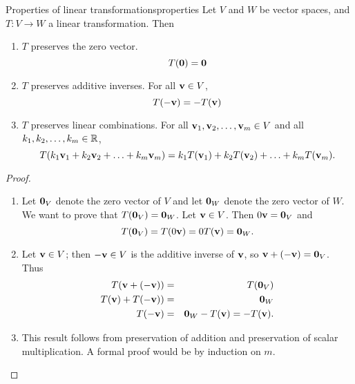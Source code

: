 \begin{theorem}{Properties of linear transformations}{properties}
  Let $V$ and $W$ be vector spaces, and $T:V \to W$ a linear
  transformation.  Then
  \begin{enumerate}
  \item $T$ preserves the zero vector.
    \begin{equation*}
      T(\mbox{\bf 0})=\mbox{\bf 0}
    \end{equation*}
  \item $T$ preserves additive inverses.
    For all $\mbox{\bf v}\in V$,
    \begin{equation*}
      T(-\mbox{\bf v})= -T(\mbox{\bf v})
    \end{equation*}
  \item $T$ preserves linear combinations.
    For all $\mbox{\bf v}_1, \mbox{\bf v}_2, \ldots, \mbox{\bf v}_m \in V$ and
    all $k_1, k_2, \ldots, k_m\in\mathbb{R}$,
    \begin{equation*}
      T(k_1\mbox{\bf v}_1 + k_2\mbox{\bf v}_2 + \ldots + k_m\mbox{\bf v}_m)
      = k_1T(\mbox{\bf v}_1) + k_2T(\mbox{\bf v}_2) + \ldots + k_mT(\mbox{\bf v}_m).
    \end{equation*}
  \end{enumerate}
\end{theorem}

\begin{proof}
  \begin{enumerate}
  \item Let $\mbox{\bf 0}_V$ denote the zero vector of $V$ and let
    $\mbox{\bf 0}_W$ denote the zero vector of $W$.  We want to prove that
    $T(\mbox{\bf 0}_V)=\mbox{\bf 0}_W$.  Let $\mbox{\bf v}\in V$.  Then
    $0\mbox{\bf v}=\mbox{\bf 0}_V$ and
    \begin{equation*}
      T(\mbox{\bf 0}_V)=T(0\mbox{\bf v})=0T(\mbox{\bf v})=\mbox{\bf 0}_W.
    \end{equation*}
  \item Let $\mbox{\bf v}\in V$; then $-\mbox{\bf v}\in V$ is the additive
    inverse of $\mbox{\bf v}$, so $\mbox{\bf v} + (-\mbox{\bf v})=\mbox{\bf 0}_V$.
    Thus
    \begin{eqnarray*}
      T(\mbox{\bf v} + (-\mbox{\bf v})) & = & T(\mbox{\bf 0}_V) \\
      T(\mbox{\bf v}) + T(-\mbox{\bf v})) & = & \mbox{\bf 0}_W \\
      T(-\mbox{\bf v}) & = & \mbox{\bf 0}_W - T(\mbox{\bf v}) =  - T(\mbox{\bf v}).
    \end{eqnarray*}
  \item This result follows from preservation of addition and
    preservation of scalar multiplication.  A formal proof would be by
    induction on $m$.
  \end{enumerate}
\end{proof}

